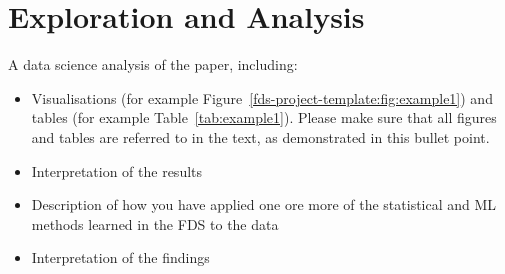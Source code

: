\section{Exploration and Analysis}
        
    A data science analysis of the paper, including: \begin{itemize} \item
        Visualisations (for example Figure~\ref{fds-project-template:fig:example1}) and
        tables (for example Table~\ref{tab:example1}).
    Please make sure that all figures and tables are referred to in the text, as
        demonstrated in this bullet point.
    \item Interpretation of the results
    \item Description of how you have applied one ore more of the
    statistical and ML methods learned in the FDS to the data
    \item Interpretation of the findings
    \end{itemize}

